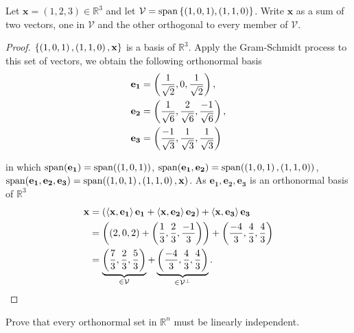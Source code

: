 \begin{exercise}{1.18}
	Let $\mathbf{x} = (1,2,3) \in \mathbb{R}^{3}$ and let $\mathcal{V} = \operatorname{span}\left\{{(1,0,1), (1,1,0)}\right\}$. Write $\mathbf{x}$ as a sum of two vectors, one in $\mathcal{V}$ and the other orthogonal to every member of $\mathcal{V}$.
\end{exercise}

\begin{proof}
	$\left\{{\left({1, 0, 1}\right), \left({1, 1, 0}\right), \mathbf{x}}\right\}$ is a basis of $\mathbb{R}^{3}$. Apply the Gram-Schmidt process to this set of vectors, we obtain the following orthonormal basis
	\begin{align*}
		\mathbf{e_{1}} & = \left({\frac{1}{\sqrt{2}}, 0, \frac{1}{\sqrt{2}}}\right),                   \\
		\mathbf{e_{2}} & = \left({\frac{1}{\sqrt{6}}, \frac{2}{\sqrt{6}}, \frac{-1}{\sqrt{6}}}\right), \\
		\mathbf{e_{3}} & = \left({\frac{-1}{\sqrt{3}}, \frac{1}{\sqrt{3}}, \frac{1}{\sqrt{3}}}\right)
	\end{align*}

	in which $\operatorname{span}(\mathbf{e_{1}}) = \operatorname{span}(\left({1,0,1}\right))$, $\operatorname{span}(\mathbf{e_{1}}, \mathbf{e_{2}}) = \operatorname{span}(\left({1,0,1}\right), \left({1,1,0}\right))$, $\operatorname{span}(\mathbf{e_{1}}, \mathbf{e_{2}}, \mathbf{e_{3}}) = \operatorname{span}(\left({1,0,1}\right), \left({1,1,0}\right), \mathbf{x})$. As $\mathbf{e_{1}}, \mathbf{e_{2}}, \mathbf{e_{3}}$ is an orthonormal basis of $\mathbb{R}^{3}$
	\begin{align*}
		\mathbf{x} & = (\left\langle{\mathbf{x}, \mathbf{e_{1}}}\right\rangle\mathbf{e_{1}} + \left\langle{\mathbf{x}, \mathbf{e_{2}}}\right\rangle\mathbf{e_{2}}) + \left\langle{\mathbf{x}, \mathbf{e_{3}}}\right\rangle\mathbf{e_{3}}        \\
		           & = \left(\left({2,0,2}\right) + \left({\frac{1}{3}, \frac{2}{3}, \frac{-1}{3}}\right)\right) + \left({\frac{-4}{3}, \frac{4}{3}, \frac{4}{3}}\right)                                                \\
		           & = \underbrace{\left({\frac{7}{3}, \frac{2}{3}, \frac{5}{3}}\right)}_{\in\mathcal{V}} + \underbrace{\left({\frac{-4}{3}, \frac{4}{3}, \frac{4}{3}}\right)}_{\in\mathcal{V}^{\perp}}.\qedhere
	\end{align*}
\end{proof}

\begin{exercise}{1.19}
	Prove that every orthonormal set in $\mathbb{R}^{n}$ must be linearly independent.
\end{exercise}

